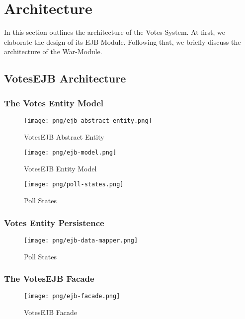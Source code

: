 \section{Architecture}

In this section outlines the architecture of the Votes-System.
At first, we elaborate the design of its EJB-Module.
Following that, we briefly discuss the architecture of the War-Module.


\subsection{VotesEJB Architecture}
\subsubsection{The Votes Entity Model}
\begin{figure}
\centering
\texttt{[image: png/ejb-abstract-entity.png]}
\caption{VotesEJB Abstract Entity}
\label{figure:ejb-abstract-entity}
\end{figure}
\begin{figure}
\centering
\texttt{[image: png/ejb-model.png]}
\caption{VotesEJB Entity Model}
\label{figure:ejb-model}
\end{figure}
\begin{figure}
\centering
\texttt{[image: png/poll-states.png]}
\caption{Poll States}
\label{figure:poll-states}
\end{figure}
\subsubsection{Votes Entity Persistence}
\begin{figure}
\centering
\texttt{[image: png/ejb-data-mapper.png]}
\caption{Poll States}
\label{figure:ejb-data-mapper}
\end{figure}

\subsubsection{The VotesEJB Facade}
\begin{figure}
\centering
\texttt{[image: png/ejb-facade.png]}
\caption{VotesEJB Facade}
\label{figure:ejb-facade}
\end{figure}


